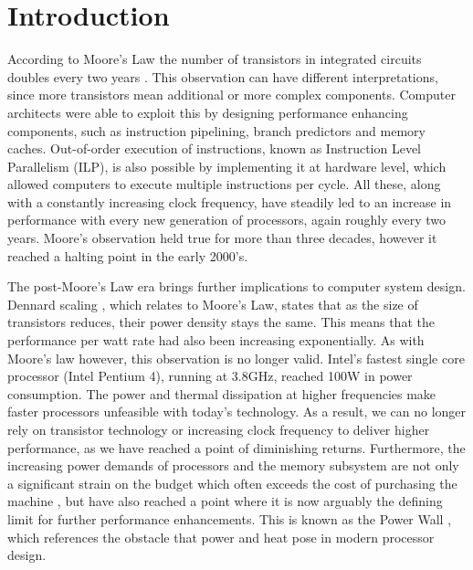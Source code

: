 
\chapter{Introduction}
\label{chap:introduction}
 
According to Moore's Law the number of transistors in integrated circuits doubles every
two years \cite{Moore:2000:CMC:333067.333074}.  This observation can have different
interpretations, since more transistors mean additional or more complex components.
Computer architects were able to exploit this by designing performance enhancing
components, such as instruction pipelining, branch predictors and memory caches.
Out-of-order execution of instructions, known as Instruction Level Parallelism (ILP), is
also possible by implementing it at hardware level, which allowed computers to execute
multiple instructions per cycle.  All these, along with a constantly increasing clock
frequency, have steadily led to an increase in performance with every new generation of
processors, again roughly every two years.  Moore's observation held true for more than
three decades, however it reached a halting point in the early 2000's.  
 
The post-Moore's Law era brings further implications to computer system design.  Dennard
scaling \cite{1050511}, which relates to Moore's Law, states that as the size of
transistors reduces, their power density stays the same.  This means that the performance
per watt rate had also been increasing exponentially.  As with Moore's law however, this
observation is no longer valid.  Intel's fastest single core processor (Intel Pentium 4),
running at 3.8GHz, reached 100W in power consumption.  The power and thermal dissipation
at higher frequencies make faster processors unfeasible with today's technology.   As a
result, we can no longer rely on transistor technology or increasing clock frequency to
deliver higher performance, as we have reached a point of diminishing returns.
Furthermore, the increasing power demands of processors and the memory subsystem are not
only a significant strain on the budget which often exceeds the cost of purchasing the
machine \cite{Rimal:2009:TSC:1683301.1684085}, but have also reached a point where it is
now arguably the defining limit for further performance enhancements. This is known as the
Power Wall \cite{917539}, which references the obstacle that power and heat pose in modern
processor design.

